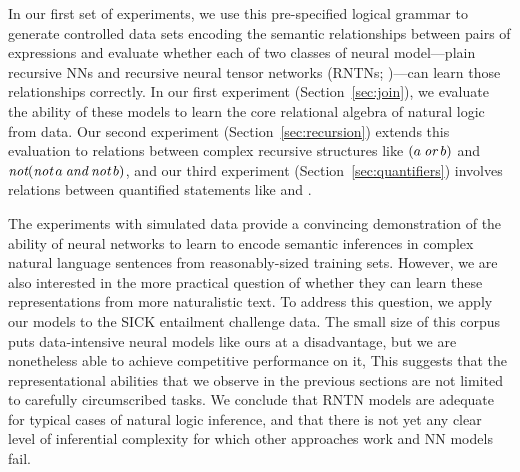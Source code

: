 In our first set of experiments, we use this pre-specified logical
grammar to generate controlled data sets encoding the semantic
relationships between pairs of expressions and evaluate whether each
of two classes of neural model---plain recursive NNs and recursive neural
tensor networks (RNTNs; \citealt{socher2013acl1})---can learn those
relationships correctly. In our first experiment
(Section~\ref{sec:join}), we evaluate the ability of these models to
learn the core relational algebra of natural logic from data. Our
second experiment (Section~\ref{sec:recursion}) extends this
evaluation to relations between complex recursive structures like
$(a \mathbin{\textit{or}} b)$ and $\mathop{\textit{not}} (\mathop{\textit{not}} a \mathbin{\textit{and}} \mathop{\textit{not}} b)$, and our third
experiment (Section~\ref{sec:quantifiers}) involves relations between
quantified statements like  and . 

The experiments with simulated data provide a convincing demonstration
of the ability of neural networks to learn to encode semantic
inferences in complex natural language sentences from reasonably-sized
training sets. However, we are also interested in the more practical
question of whether they can learn these representations from more
naturalistic text. To address this question, we apply our models to
the SICK entailment challenge data. The small size of this corpus puts
data-intensive neural models like ours at a disadvantage, but we are
nonetheless able to achieve competitive performance on it,
This suggests that the representational abilities that we observe in the previous sections
are not limited to carefully circumscribed tasks. We conclude that RNTN models
are adequate for typical cases of natural logic inference, and that there is not yet
any clear level of inferential complexity for which other approaches work and NN models fail.


